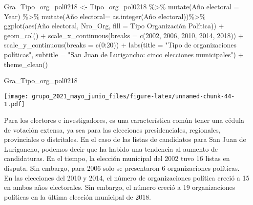 \documentclass[
]{book}
\newenvironment{Shaded}{\begin{snugshade}}{\end{snugshade}}
\newcommand{\AttributeTok}[1]{\textcolor[rgb]{0.77,0.63,0.00}{#1}}
\newcommand{\DecValTok}[1]{\textcolor[rgb]{0.00,0.00,0.81}{#1}}
\newcommand{\FunctionTok}[1]{\textcolor[rgb]{0.00,0.00,0.00}{#1}}
\newcommand{\NormalTok}[1]{#1}
\newcommand{\OtherTok}[1]{\textcolor[rgb]{0.56,0.35,0.01}{#1}}
\newcommand{\SpecialCharTok}[1]{\textcolor[rgb]{0.00,0.00,0.00}{#1}}
\newcommand{\StringTok}[1]{\textcolor[rgb]{0.31,0.60,0.02}{#1}}
\begin{document}
\begin{Shaded}
\begin{Highlighting}[]
\NormalTok{Gra\_Tipo\_org\_pol0218 }\OtherTok{\textless{}{-}}\NormalTok{ Tipo\_org\_pol0218 }\SpecialCharTok{\%\textgreater{}\%}
  \FunctionTok{mutate}\NormalTok{(}\StringTok{\textasciigrave{}}\AttributeTok{Año electoral}\StringTok{\textasciigrave{}} \OtherTok{=}\NormalTok{ Year) }\SpecialCharTok{\%\textgreater{}\%}
  \FunctionTok{mutate}\NormalTok{(}\StringTok{\textasciigrave{}}\AttributeTok{Año electoral}\StringTok{\textasciigrave{}}\OtherTok{=} \FunctionTok{as.integer}\NormalTok{(}\StringTok{\textasciigrave{}}\AttributeTok{Año electoral}\StringTok{\textasciigrave{}}\NormalTok{))}\SpecialCharTok{\%\textgreater{}\%}
\FunctionTok{ggplot}\NormalTok{(}\FunctionTok{aes}\NormalTok{(}\StringTok{\textasciigrave{}}\AttributeTok{Año electoral}\StringTok{\textasciigrave{}}\NormalTok{, Nro\_Org, }\AttributeTok{fill =} \StringTok{\textasciigrave{}}\AttributeTok{Tipo Organización Política}\StringTok{\textasciigrave{}}\NormalTok{)) }\SpecialCharTok{+}
  \FunctionTok{geom\_col}\NormalTok{() }\SpecialCharTok{+}
\FunctionTok{scale\_x\_continuous}\NormalTok{(}\AttributeTok{breaks =} \FunctionTok{c}\NormalTok{(}\DecValTok{2002}\NormalTok{, }\DecValTok{2006}\NormalTok{, }\DecValTok{2010}\NormalTok{, }\DecValTok{2014}\NormalTok{, }\DecValTok{2018}\NormalTok{)) }\SpecialCharTok{+}
  \FunctionTok{scale\_y\_continuous}\NormalTok{(}\AttributeTok{breaks =} \FunctionTok{c}\NormalTok{(}\DecValTok{0}\SpecialCharTok{:}\DecValTok{20}\NormalTok{)) }\SpecialCharTok{+}
  \FunctionTok{labs}\NormalTok{(}\AttributeTok{title =} \StringTok{"Tipo de organizaciones políticas"}\NormalTok{,}
       \AttributeTok{subtitle =} \StringTok{"San Juan de Lurigancho: cinco elecciones municipales"}\NormalTok{) }\SpecialCharTok{+}
  \FunctionTok{theme\_clean}\NormalTok{()}
\end{Highlighting}
\end{Shaded}

\begin{Shaded}
\begin{Highlighting}[]
\NormalTok{Gra\_Tipo\_org\_pol0218}
\end{Highlighting}
\end{Shaded}

\texttt{[image: grupo\_2021\_mayo\_junio\_files/figure-latex/unnamed-chunk-44-1.pdf]}

Para los electores e investigadores, es una característica común tener una cédula de votación extensa, ya sea para las elecciones presidenciales, regionales, provinciales o distritales. En el caso de las listas de candidatos para San Juan de Lurigancho, podemos decir que ha habido una tendencia al aumento de candidaturas. En el tiempo, la elección municipal del 2002 tuvo 16 listas en disputa. Sin embargo, para 2006 solo se presentaron 6 organizaciones políticas. En las elecciones del 2010 y 2014, el número de organizaciones política creció a 15 en ambos años electorales. Sin embargo, el número creció a 19 organizaciones políticas en la última elección municipal de 2018.
\end{document}
